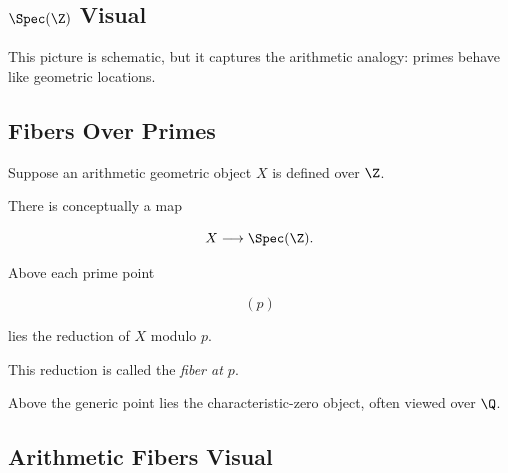 \subsection{\(\Spec(\Z)\) Visual}
\label{subsec:spec-z-visual}

\begin{centereddiagram}
\end{centereddiagram}

This picture is schematic, but it captures the arithmetic analogy:
primes behave like geometric locations.

\subsection{Fibers Over Primes}
\label{subsec:fibers-over-primes}

Suppose an arithmetic geometric object \(X\) is defined over \(\Z\).

There is conceptually a map

\[ X\longrightarrow\Spec(\Z). \]

Above each prime point

\[ (p) \]

lies the reduction of \(X\) modulo \(p\).

This reduction is called the \emph{fiber at \(p\)}.

Above the generic point lies the characteristic-zero object, often viewed
over \(\Q\).

\subsection{Arithmetic Fibers Visual}
\label{subsec:arithmetic-fibers-visual}

